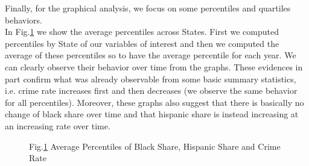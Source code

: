 \documentclass[a4paper,12pt]{article}
\begin{document}
\noindent
Finally, for the graphical analysis, we focus on some percentiles and quartiles behaviors.
\\In Fig.\ref{avg_percentiles} we show the average percentiles across States. First we computed percentiles by State of our variables of interest and then we computed the average of these percentiles so to have the average percentile for each year. We can clearly observe their behavior over time from the graphs. These evidences in part confirm what was already observable from some basic summary statistics, i.e. crime rate increases first and then decreases (we observe the same behavior for all percentiles). Moreover, these graphs also suggest that there is basically no change of black share over time and that hispanic share is instead increasing at an increasing rate over time. 

\begin{figure}[H]
\caption{Fig.\ref{avg_percentiles} Average Percentiles of Black Share, Hispanic Share and Crime Rate}
\hspace*{.2in}
\label{avg_percentiles}
\end{figure}
\end{document}
